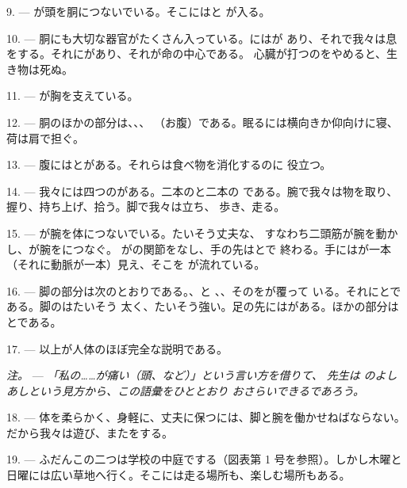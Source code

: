 9. --- が頭を胴につないでいる。そこにはと
が入る。

10. --- 胴にも大切な器官がたくさん入っている。にはが
あり、それで我々は息をする。それにがあり、それが命の中心である。
心臓が打つのをやめると、生き物は死ぬ。

11. --- が胸を支えている。

12. --- 胴のほかの部分は、、、
（お腹）である。眠るには横向きか仰向けに寝、荷は肩で担ぐ。

13. --- 腹にはとがある。それらは食べ物を消化するのに
役立つ。

\VUsaut{4.4mm}
\VUsaut{3.0mm}

14. --- 我々には四つのがある。二本のと二本の
である。腕で我々は物を取り、握り、持ち上げ、拾う。脚で我々は立ち、
歩き、走る。

15. --- が腕を体につないでいる。たいそう丈夫な、
すなわち二頭筋が腕を動かし、が腕をにつなぐ。
がの関節をなし、手の先はとで
終わる。手にはが一本（それに動脈が一本）見え、そこを
が流れている。

16. --- 脚の部分は次のとおりである。、と
、、そのをが覆って
いる。それにとである。脚のはたいそう
太く、たいそう強い。足の先にはがある。ほかの部分は
とである。

17. --- 以上が人体のほぼ完全な説明である。

\textit{注。} --- \textit{「私の……が痛い（頭、など）」という言い方を借りて、
先生は} \textit{のよしあしという見方から、この語彙をひととおり
おさらいできるであろう。}

\VUsaut{5.0mm}
\VUsaut{2.4mm}
\VUsaut{3.0mm}

18. --- 体を柔らかく、身軽に、丈夫に保つには、脚と腕を働かせねばならない。
だから我々は遊び、またをする。

19. --- ふだんこの二つは学校の中庭でする（図表第 1 号を参照）。しかし木曜と
日曜には広い草地へ行く。そこには走る場所も、楽しむ場所もある。

